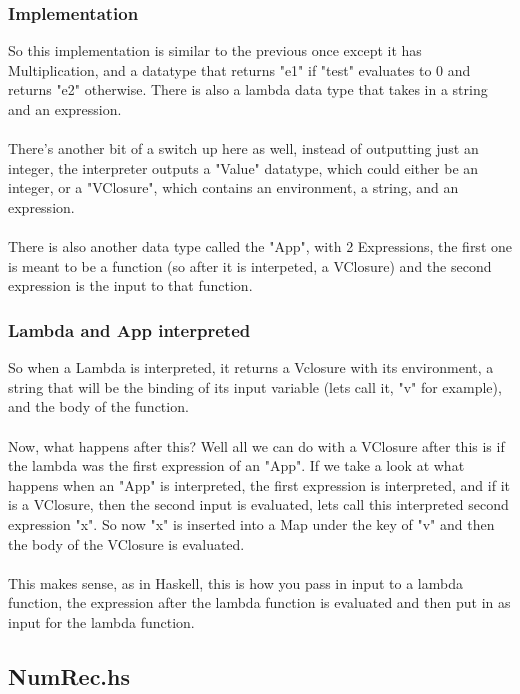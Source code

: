 \documentclass[12pt]{article}
\begin{document}
\subsubsection{Implementation}

So this implementation is similar to the previous once except it has Multiplication, and a datatype that returns "e1" if "test" evaluates to 0 and returns "e2" otherwise. There is also a lambda data type that takes in a string and an expression.\\
\\
There's another bit of a switch up here as well, instead of outputting just an integer, the interpreter outputs a "Value" datatype, which could either be an integer, or a "VClosure", which contains an environment, a string, and an expression.\\
\\
There is also another data type called the "App", with 2 Expressions, the first one is meant to be a function (so after it is interpeted, a VClosure) and the second expression is the input to that function.

\subsubsection{Lambda and App interpreted}

So when a Lambda is interpreted, it returns a Vclosure with its environment, a string that will be the binding of its input variable (lets call it, "v" for example), and the body of the function.\\
\\
Now, what happens after this? Well all we can do with a VClosure after this is if the lambda was the first expression of an "App". If we take a look at what happens when an "App" is interpreted, the first expression is interpreted, and if it is a VClosure, then the second input is evaluated, lets call this interpreted second expression "x". So now "x" is inserted into a Map under the key of "v" and then the body of the VClosure is evaluated.\\
\\
This makes sense, as in Haskell, this is how you pass in input to a lambda function, the expression after the lambda function is evaluated and then put in as input for the lambda function.

\newpage

\subsection{NumRec.hs}
\end{document}
